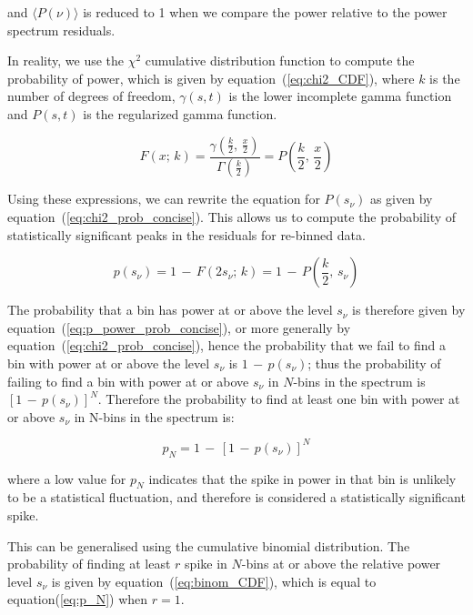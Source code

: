 and $\langle P(\nu) \rangle$ is reduced to 1 when we compare the power relative to the power spectrum residuals.

In reality, we use the $\chi^2$ cumulative distribution function to compute the probability of power, which is given by equation~(\ref{eq:chi2_CDF}), where $k$ is the number of degrees of freedom, $\gamma(s,t)$ is the lower incomplete gamma function and $P(s,t)$ is the regularized gamma function. 

\begin{equation}
F(x; \, k) = \frac{\gamma (\frac{k}{2}, \, \frac{x}{2})}{\Gamma(\frac{k}{2})} = P\left(\frac{k}{2}, \, \frac{x}{2}\right)
\label{eq:chi2_CDF}
\end{equation}


Using these expressions, we can rewrite the equation for $P(s_{\nu})$ as given by equation~(\ref{eq:chi2_prob_concise}). This allows us to compute the probability of statistically significant peaks in the residuals for re-binned data.

\begin{equation}
p(s_{\nu}) = 1 \, - \, F(2s_{\nu}; \, k) =1 \, - \, P\left(\frac{k}{2}, \, s_{\nu}\right)
\label{eq:chi2_prob_concise}
\end{equation}


The probability that a bin has power at or above the level $s_{\nu}$ is therefore given by equation~(\ref{eq:p_power_prob_concise}), or more generally by equation~(\ref{eq:chi2_prob_concise}), hence the probability that we fail to find a bin with power at or above the level $s_{\nu}$ is $1 \, - \, p(s_{\nu})$; thus the probability of failing to find a bin with power at or above $s_{\nu}$ in $N$-bins in the spectrum is $[1 \, - \, p(s_{\nu})]^N$. Therefore the probability to find at least one bin with power at or above $s_{\nu}$ in N-bins in the spectrum is:

\begin{equation}
p_N = 1\, - \, [1 \, - \, p(s_{\nu})]^N
\label{eq:p_N}
\end{equation}

where a low value for $p_N$ indicates that the spike in power in that bin is unlikely to be a statistical fluctuation, and therefore is considered a statistically significant spike.

This can be generalised using the cumulative binomial distribution. The probability of finding at least $r$ spike in $N$-bins at or above the relative power level $s_{\nu}$ is given by equation~(\ref{eq:binom_CDF}), which is equal to equation(\ref{eq:p_N}) when $r=1$.

